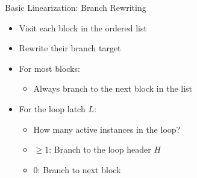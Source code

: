 
\begin{frame}{Basic Linearization: Branch Rewriting}

\begin{minipage}[t]{0.55\linewidth}

\begin{itemize}
    \item Visit each block in the ordered list
    \item Rewrite their branch target
\end{itemize}

\begin{itemize}
    \item For most blocks:
    \begin{itemize}
        \item Always branch to the next block in the list
    \end{itemize}
    \item For the loop latch $L$:
    \begin{itemize}
        \item How many active instances in the loop?
        \item $\geq 1$: Branch to the loop header $H$
        \item $0$: Branch to next block
    \end{itemize}
\end{itemize}

\end{minipage}
\begin{minipage}[t]{0.42\linewidth}

\vspace{0.1ex}


\end{minipage}

\end{frame}

